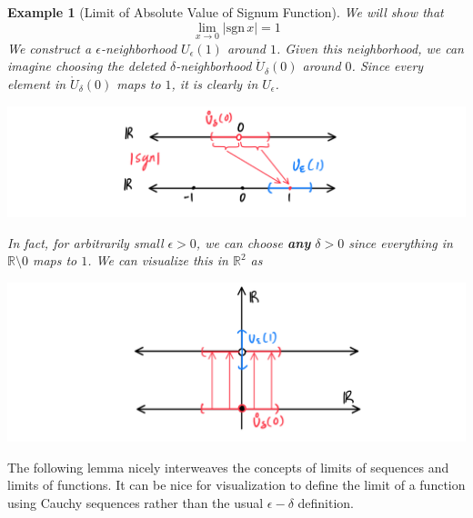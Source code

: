 \documentclass{article}
\newtheorem{example}{Example}[section]
\theoremstyle{remark}
\theoremstyle{definition}
\begin{document}
\begin{example}[Limit of Absolute Value of Signum Function]
We will show that 
\[\lim_{x \rightarrow 0} |\text{sgn}\,x| = 1\]
We construct a $\epsilon$-neighborhood $U_\epsilon (1)$ around $1$. Given this neighborhood, we can imagine choosing the deleted $\delta$-neighborhood $\mathring{U}_\delta (0)$ around $0$. Since every element in $\mathring{U}_\delta (0)$ maps to $1$, it is clearly in $U_\epsilon$. 
\begin{center}
    \includegraphics[scale=0.3]{img/Absolute_Value_of_Signum.PNG}
\end{center}
In fact, for arbitrarily small $\epsilon > 0$, we can choose \textbf{any} $\delta>0$ since everything in $\mathbb{R} \setminus 0$ maps to $1$. We can visualize this in $\mathbb{R}^2$ as
\begin{center}
    \includegraphics[scale=0.3]{img/Absolute_Value_of_Signum_2.PNG}
\end{center}
\end{example}

The following lemma nicely interweaves the concepts of limits of sequences and limits of functions. It can be nice for visualization to define the limit of a function using Cauchy sequences rather than the usual $\epsilon-\delta$ definition. 
\end{document}
